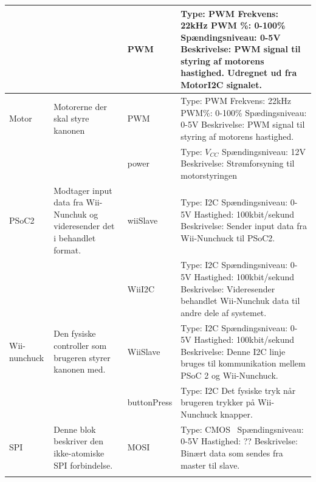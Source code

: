 \begin{longtable}{|>{\hspace{0pt}}p{3cm} | >{\hspace{0pt}}p{3cm} | p{2cm} | p{3cm} |}
	& & PWM & Type: PWM \newline Frekvens: 22kHz \newline PWM \%: 0-100\% \newline Spændingsniveau: 0-5V \newline Beskrivelse: PWM signal til styring af motorens hastighed. Udregnet ud fra MotorI2C signalet. \\ \hline
	Motor & Motorerne der skal styre kanonen & PWM & Type: PWM \newline Frekvens: 22kHz \newline PWM\%: 0-100\% \newline Spædingsniveau: 0-5V \newline Beskrivelse: PWM signal til styring af motorens hastighed. \\ \cline{3-4}
	& & power & Type: \(V_{CC}\) \newline Spændingsniveau: 12V \newline Beskrivelse: Strømforsyning til motorstyringen  \\ \hline
	PSoC2 & Modtager input data fra Wii-Nunchuk og videresender det i behandlet format. & wiiSlave & Type: I2C \newline Spændingsniveau: 0-5V \newline Hastighed: 100kbit/sekund \newline Beskrivelse: Sender input data fra Wii-Nunchuck til PSoC2. \\ \cline{3-4}
	& & WiiI2C & Type: I2C \newline Spændingsniveau: 0-5V \newline Hastighed: 100kbit/sekund \newline Beskrivelse: Videresender behandlet Wii-Nunchuk data til andre dele af systemet. \\ \hline
	Wii-nunchuck & Den fysiske controller som brugeren styrer kanonen med. & WiiSlave & Type: I2C \newline Spændingsniveau: 0-5V \newline Hastighed: 100kbit/sekund \newline Beskrivelse: Denne I2C linje bruges til kommunikation mellem PSoC 2 og Wii-Nunchuck. \\ \cline{3-4}
	& & buttonPress & Type: I2C \newline Det fysiske tryk når brugeren trykker på Wii-Nunchuck knapper. \\ \hline
	SPI & Denne blok beskriver den ikke-atomiske SPI forbindelse. & MOSI & Type: CMOS \ Spændingsniveau: 0-5V \newline Hastighed: ?? \newline Beskrivelse: Binært data som sendes fra master til slave. \\ \cline{3-4}

\end{longtable}
